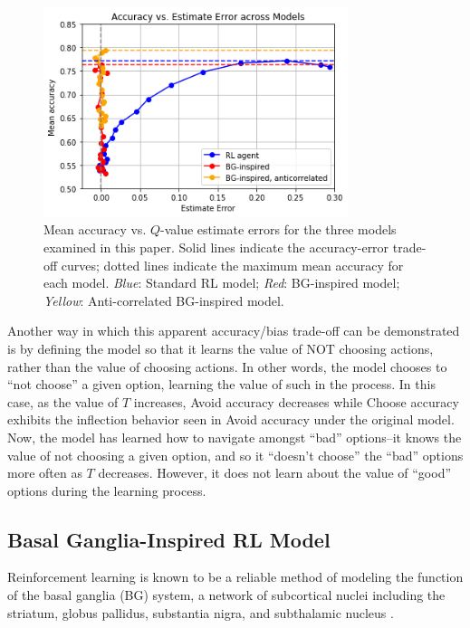 \documentclass[10pt,letterpaper]{article}
\begin{document}
\begin{figure}[ht]
	\begin{center}
		\includegraphics[width=3.5in]{roc-agents.png}
	\end{center}
	\caption{Mean accuracy vs. $Q$-value estimate errors for the three models examined in this paper. Solid lines indicate the accuracy-error trade-off curves; dotted lines indicate the maximum mean accuracy for each model. \emph{Blue}: Standard RL model; \emph{Red}: BG-inspired model; \emph{Yellow}: Anti-correlated BG-inspired model. } 
	\label{roc}
\end{figure}

Another way in which this apparent accuracy/bias trade-off can be demonstrated is by defining the model so that it learns the value of NOT choosing actions, rather than the value of choosing actions. In other words, the model chooses to ``not choose'' a given option, learning the value of such in the process. In this case, as the value of $T$ increases, Avoid accuracy decreases while Choose accuracy exhibits the inflection behavior seen in Avoid accuracy under the original model. Now, the model has learned how to navigate amongst ``bad'' options--it knows the value of not choosing a given option, and so it ``doesn't choose'' the ``bad'' options more often as $T$  decreases. However, it does not learn about the value of ``good'' options during the learning process.

\subsection{Basal Ganglia-Inspired RL Model}

Reinforcement learning is known to be a reliable method of modeling the function of the basal ganglia (BG) system, a network of subcortical nuclei including the striatum, globus pallidus, substantia nigra, and subthalamic nucleus \cite{alexander1990function}.
\end{document}
